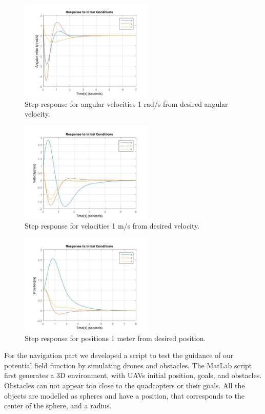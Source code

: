 \documentclass[journal]{IEEEtran}
\begin{document}
		\begin{figure}[H]
  			\centering
  			\includegraphics[width=2.5in]{Results/Controll/Fig2}
  			\caption{Step response for angular velocities 1 rad/s from desired angular velocity.}
  			\label{fig:contresangvel}
		\end{figure}	

		\begin{figure}[H]
  			\centering
  			\includegraphics[width=2.5in]{Results/Controll/Fig3}
  			\caption{Step response for velocities 1 m/s from desired velocity.}
  			\label{fig:contresvel}
		\end{figure}	
		
		\begin{figure}[H]
  			\centering
  			\includegraphics[width=2.5in]{Results/Controll/Fig4}
  			\caption{Step response for positions 1 meter from desired position.}
  			\label{fig:contrespos}
		\end{figure}	

	
	For the navigation part we developed a script to test the guidance of our potential field function by simulating drones and obstacles. The MatLab script first generates a 3D environment, with UAVs initial position, goals, and obstacles. Obstacles can not appear too close to the quadcopters or their goals. All the objects are modelled as spheres and have a position, that corresponds to the center of the sphere, and a radius.\\
	
\end{document}
